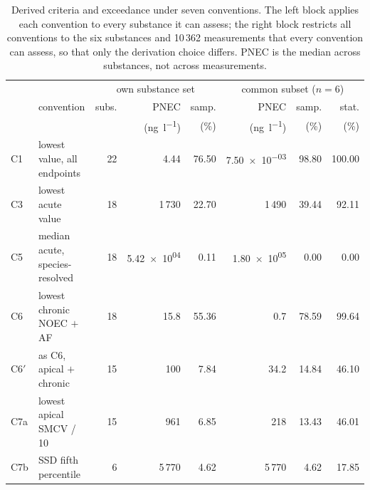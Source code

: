 \begin{table}[t]
\centering
\footnotesize
\setlength{\tabcolsep}{3.5pt}
\caption{Derived criteria and exceedance under seven conventions. The left block applies each convention to every substance it can assess; the right block restricts all conventions to the six substances and 10\,362 measurements that every convention can assess, so that only the derivation choice differs. PNEC is the median across substances, not across measurements.}
\label{tab:ladder}
\begin{tabular}{@{}ll rrr rrr@{}}
\toprule
& & \multicolumn{3}{c}{own substance set} & \multicolumn{3}{c}{common subset ($n=6$)}\\
\cmidrule(lr){3-5}\cmidrule(lr){6-8}
& convention & subs. & PNEC & samp. & PNEC & samp. & stat.\\
& & & (\si{\nano\gram\per\litre}) & (\%) & (\si{\nano\gram\per\litre}) & (\%) & (\%)\\
\midrule
C1 & lowest value, all endpoints & 22 & 4.44 & 76.50 & \num{7.50e-03} & 98.80 & 100.00\\
C3 & lowest acute value & 18 & 1\,730 & 22.70 & 1\,490 & 39.44 & 92.11\\
C5 & median acute, species-resolved & 18 & \num{5.42e+04} & 0.11 & \num{1.80e+05} & 0.00 & 0.00\\
C6 & lowest chronic NOEC $+$ AF & 18 & 15.8 & 55.36 & 0.7 & 78.59 & 99.64\\
C6$'$ & as C6, apical $+$ chronic & 15 & 100 & 7.84 & 34.2 & 14.84 & 46.10\\
C7a & lowest apical SMCV / 10 & 15 & 961 & 6.85 & 218 & 13.43 & 46.01\\
C7b & SSD fifth percentile & 6 & 5\,770 & 4.62 & 5\,770 & 4.62 & 17.85\\
\bottomrule
\end{tabular}
\end{table}
